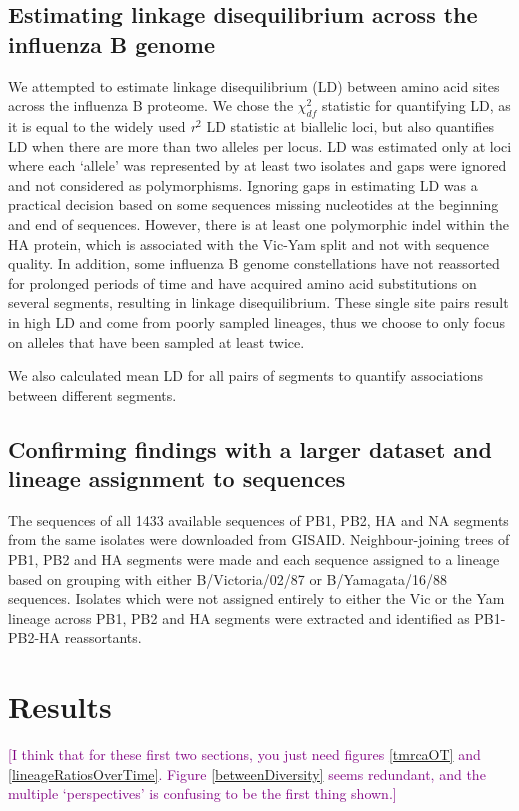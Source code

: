 \documentclass[11pt,oneside,letterpaper]{article}
\def\tbc#1{\textcolor{purple}{[#1]}}
\begin{document}
\subsection*{Estimating linkage disequilibrium across the influenza B genome}
We attempted to estimate linkage disequilibrium (LD) between amino acid sites across the influenza B proteome.
We chose the $\chi^{2}_{df}$ statistic \cite{zhao2005} for quantifying LD, as it is equal to the widely used \textit{r$^{2}$} LD statistic at biallelic loci, but also quantifies LD when there are more than two alleles per locus.
LD was estimated only at loci where each `allele' was represented by at least two isolates and gaps were ignored and not considered as polymorphisms.
Ignoring gaps in estimating LD was a practical decision based on some sequences missing nucleotides at the beginning and end of sequences.
However, there is at least one polymorphic indel within the HA protein, which is associated with the Vic-Yam split and not with sequence quality.
In addition, some influenza B genome constellations have not reassorted for prolonged periods of time and have acquired amino acid substitutions on several segments, resulting in linkage disequilibrium.
These single site pairs result in high LD and come from poorly sampled lineages, thus we choose to only focus on alleles that have been sampled at least twice.

We also calculated mean LD for all pairs of segments to quantify associations between different segments.

\subsection*{Confirming findings with a larger dataset and lineage assignment to sequences}
The sequences of all 1433 available sequences of PB1, PB2, HA and NA segments from the same isolates were downloaded from GISAID.
Neighbour-joining trees of PB1, PB2 and HA segments were made and each sequence assigned to a lineage based on grouping with either B/Victoria/02/87 or B/Yamagata/16/88 sequences.
Isolates which were not assigned entirely to either the Vic or the Yam lineage across PB1, PB2 and HA segments were extracted and identified as PB1-PB2-HA reassortants.

\section*{Results}

\tbc{I think that for these first two sections, you just need figures \ref{tmrcaOT} and \ref{lineageRatiosOverTime}.  Figure \ref{betweenDiversity} seems redundant, and the multiple `perspectives' is confusing to be the first thing shown.}
\end{document}

